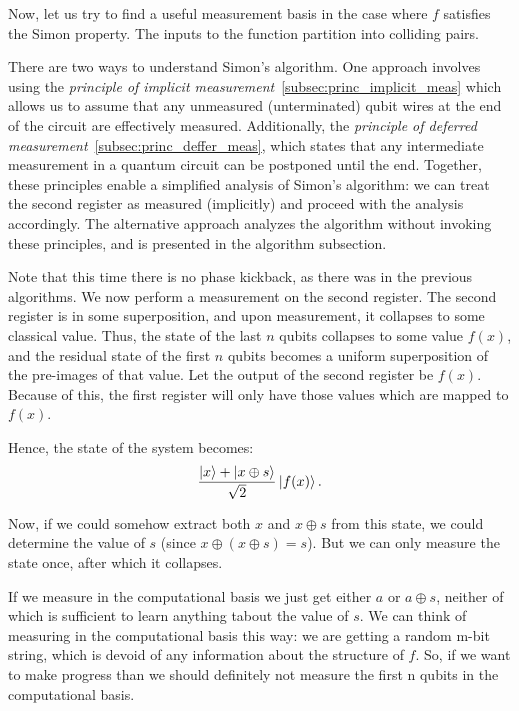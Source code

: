 Now, let us try to find a useful measurement basis in the case where $f$ satisfies the Simon property. The inputs to the function partition into colliding pairs.

\begin{importantnote}
    There are two ways to understand Simon's algorithm. One approach involves using the \emph{principle of implicit measurement}~\ref{subsec:princ_implicit_meas} which allows us to assume that any unmeasured (unterminated) qubit wires at the end of the circuit are effectively measured. Additionally, the \emph{principle of deferred measurement}~\ref{subsec:princ_deffer_meas}, which states that any intermediate measurement in a quantum circuit can be postponed until the end. Together, these principles enable a simplified analysis of Simon's algorithm: we can treat the second register as measured (implicitly) and proceed with the analysis accordingly. The alternative approach analyzes the algorithm without invoking these principles, and is presented in the algorithm subsection.
\end{importantnote}


Note that this time there is no phase kickback, as there was in the previous algorithms. We now perform a measurement on the second register. The second register is in some superposition, and upon measurement, it collapses to some classical value. Thus, the state of the last $n$ qubits collapses to some value $f(x)$, and the residual state of the first $n$ qubits becomes a uniform superposition of the pre-images of that value. Let the output of the second register be $f(x)$. Because of this, the first register will only have those values which are mapped to $f(x)$.

Hence, the state of the system becomes:
\[
    \frac{\ket{x} + \ket{x \oplus s}}{\sqrt{2}} \ket{f(x)}.
\]

Now, if we could somehow extract both $x$ and $x \oplus s$ from this state, we could determine the value of $s$ (since $x \oplus (x \oplus s) = s$). But we can only measure the state once, after which it collapses.


If we measure in the computational basis we just get either $a$ or $a \oplus s$, neither of which is sufficient to learn anything tabout the value of $s$. We can think of measuring in the computational basis this way: we are getting a random m-bit string, which is devoid of any information about the structure of $f$. So, if we want to make progress than we should definitely not measure the first n qubits in the computational basis.

